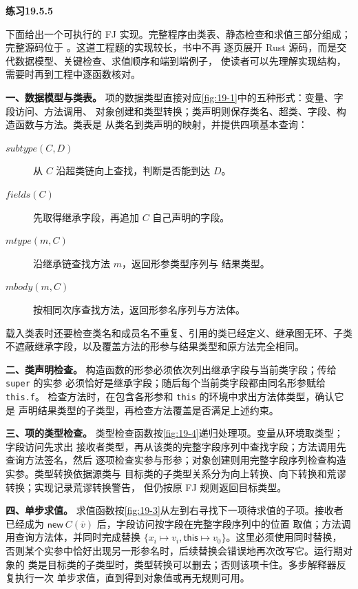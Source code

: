 \begin{taplsolutionentrybox}
\label{sol:translator:19.5.5}
\textbf{练习19.5.5}

下面给出一个可执行的 FJ 实现。完整程序由类表、静态检查和求值三部分组成；
完整源码位于
。这道工程题的实现较长，书中不再
逐页展开 Rust 源码，而是交代数据模型、关键检查、求值顺序和端到端例子，
使读者可以先理解实现结构，需要时再到工程中逐函数核对。

\textbf{一、数据模型与类表。}
项的数据类型直接对应\cref{fig:19-1}中的五种形式：变量、字段访问、方法调用、
对象创建和类型转换；类声明则保存类名、超类、字段、构造函数与方法。类表是
从类名到类声明的映射，并提供四项基本查询：
\begin{description}
\item[\(\mathit{subtype}(C,D)\)] 从 \(C\) 沿超类链向上查找，判断是否能到达
\(D\)。
\item[\(\mathit{fields}(C)\)] 先取得继承字段，再追加 \(C\) 自己声明的字段。
\item[\(\mathit{mtype}(m,C)\)] 沿继承链查找方法 \(m\)，返回形参类型序列与
结果类型。
\item[\(\mathit{mbody}(m,C)\)] 按相同次序查找方法，返回形参名序列与方法体。
\end{description}
载入类表时还要检查类名和成员名不重复、引用的类已经定义、继承图无环、子类
不遮蔽继承字段，以及覆盖方法的形参与结果类型和原方法完全相同。

\textbf{二、类声明检查。}
构造函数的形参必须依次列出继承字段与当前类字段；传给 \texttt{super} 的实参
必须恰好是继承字段；随后每个当前类字段都由同名形参赋给 \texttt{this.f}。
检查方法时，在包含各形参和 \texttt{this} 的环境中求出方法体类型，确认它是
声明结果类型的子类型，再检查方法覆盖是否满足上述约束。

\textbf{三、项的类型检查。}
类型检查函数按\cref{fig:19-4}递归处理项。变量从环境取类型；字段访问先求出
接收者类型，再从该类的完整字段序列中查找字段；方法调用先查询方法签名，然后
逐项检查实参与形参；对象创建则用完整字段序列检查构造实参。类型转换依据源类与
目标类的子类型关系分为向上转换、向下转换和荒谬转换；实现记录荒谬转换警告，
但仍按原 FJ 规则返回目标类型。

\textbf{四、单步求值。}
求值函数按\cref{fig:19-3}从左到右寻找下一项待求值的子项。接收者已经成为
\(\mathsf{new}\ C(\overline v)\) 后，字段访问按字段在完整字段序列中的位置
取值；方法调用查询方法体，并同时完成替换
\(\{x_i\mapsto v_i,\mathsf{this}\mapsto v_0\}\)。这里必须使用同时替换，
否则某个实参中恰好出现另一形参名时，后续替换会错误地再次改写它。运行期对象的
类是目标类的子类型时，类型转换可以删去；否则该项卡住。多步解释器反复执行一次
单步求值，直到得到对象值或再无规则可用。


\end{taplsolutionentrybox}
